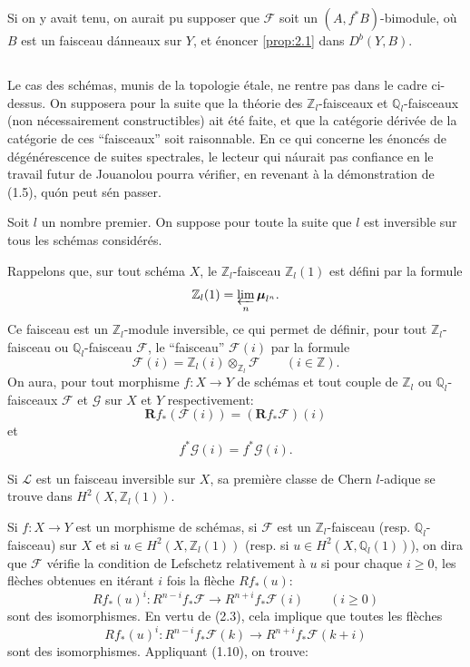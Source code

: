 \documentclass[12pt]{amsart}
\theoremstyle{plain}
\theoremstyle{remark}
\newcommand{\cF}{\mathscr{F}}
\newcommand{\cG}{\mathscr{G}}
\newcommand{\cL}{\mathscr{L}}
\newcommand{\Rf}{\mathbf{R}f_*}
\newcommand{\db}{D^b}
\begin{document}
Si on y avait tenu, on aurait pu supposer que $\cF$ soit un $(A, f^*B)$-bimodule, o\`u $B$ est un faisceau d\'anneaux sur $Y$, et \'enoncer \eqref{prop:2.1} dans $\db(Y, B)$.

\subsection{}
Le cas des sch\'emas, munis de la topologie \'etale, ne rentre pas dans le cadre ci-dessus. On supposera pour la suite que la th\'eorie des $\mathbb{Z}_l$-faisceaux et $\mathbb{Q}_l$-faisceaux (non n\'ecessairement constructibles) ait \'et\'e faite, et que la cat\'egorie d\'eriv\'ee de la cat\'egorie de ces ``faisceaux'' soit raisonnable. En ce qui concerne les \'enonc\'es de d\'eg\'en\'erescence de suites spectrales, le lecteur qui n\'aurait pas confiance en le travail futur de Jouanolou pourra v\'erifier, en revenant \`a la d\'emonstration de (1.5), qu\'on peut s\'en passer.

Soit $l$ un nombre premier. On suppose pour toute la suite que $l$ est inversible sur tous les sch\'emas consid\'er\'es.

Rappelons que, sur tout sch\'ema $X$, le $\mathbb{Z}_l$-faisceau $\mathbb{Z}_l(1)$ est d\'efini par la formule
\[
\mathbb{Z}_l(1) = \varprojlim_n \boldsymbol{\mu}_{l^n}.
\]
Ce faisceau est un $\mathbb{Z}_l$-module inversible, ce qui permet de d\'efinir, pour tout $\mathbb{Z}_l$-faisceau ou $\mathbb{Q}_l$-faisceau $\cF$, le ``faisceau'' $\cF(i)$ par la formule
\[
\cF(i) = \mathbb{Z}_l(i) \otimes_{\mathbb{Z}_l} \cF \qquad (i \in \mathbb{Z}).
\]
On aura, pour tout morphisme $f : X \to Y$ de sch\'emas et tout couple de $\mathbb{Z}_l$ ou $\mathbb{Q}_l$-faisceaux $\cF$ et $\cG$ sur $X$ et $Y$ respectivement:
\begin{equation}\label{eq:2.3}
\Rf(\cF(i)) = (\Rf\cF)(i)
\end{equation}
et
\[
f^*\cG(i) = f^*\cG(i).
\]

Si $\cL$ est un faisceau inversible sur $X$, sa premi\`ere classe de Chern $l$-adique se trouve dans $H^2(X, \mathbb{Z}_l(1))$.

Si $f : X \to Y$ est un morphisme de sch\'emas, si $\cF$ est un $\mathbb{Z}_l$-faisceau (resp. $\mathbb{Q}_l$-faisceau) sur $X$ et si $u \in H^2(X, \mathbb{Z}_l(1))$ (resp. si $u \in H^2(X, \mathbb{Q}_l(1))$), on dira que $\cF$ v\'erifie la condition de Lefschetz relativement \`a $u$ si pour chaque $i \geq 0$, les fl\`eches obtenues en it\'erant $i$ fois la fl\`eche $Rf_*(u)$:
\[
Rf_*(u)^i : R^{n-i}f_*\cF \longrightarrow R^{n+i}f_*\cF(i) \qquad (i \geq 0)
\]
sont des isomorphismes. En vertu de (2.3), cela implique que toutes les fl\`eches
\[
Rf_*(u)^i : R^{n-i}f_*\cF(k) \longrightarrow R^{n+i}f_*\cF(k+i)
\]
sont des isomorphismes. Appliquant (1.10), on trouve:
\end{document}
